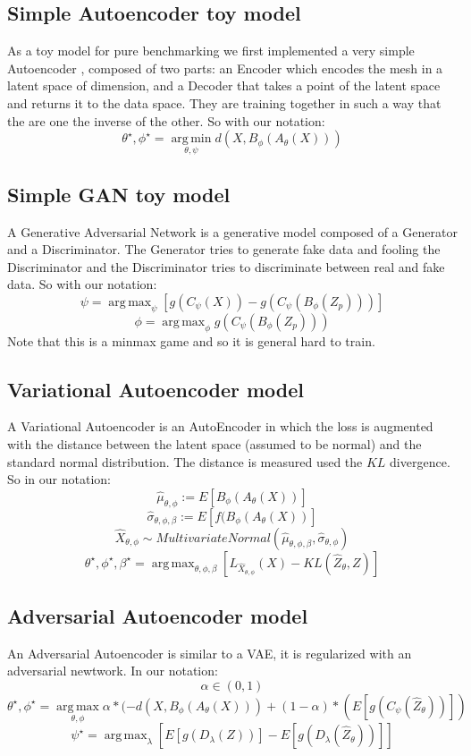 \documentclass{article}
\DeclareMathOperator*{\argmax}{arg\,max}
\DeclareMathOperator*{\argmin}{arg\,min}
\begin{document}
\subsection{Simple Autoencoder toy model}
As a toy model for pure benchmarking we first implemented a very simple Autoencoder \cite{auto}, composed of two parts: an Encoder which encodes the mesh in a latent space of dimension, and a Decoder that takes a point of the latent space and returns it to the data space. They are training together in such a way that the are one the inverse of the other. So with our notation:
$$\theta^{\star},\phi^{\star}=\argmin \limits_{\theta,\psi}d(X,B_{\phi}(A_{\theta}(X)))$$

\subsection{Simple GAN toy model}
A Generative Adversarial Network \cite{gan} is a generative model composed of a Generator and a Discriminator. The Generator tries to generate fake data and fooling the Discriminator and the Discriminator tries to discriminate between real and fake data. So with our notation:
$$\psi=\argmax_{\psi}[g(C_{\psi}(X))-g(C_{\psi}(B_{\phi}(Z_{p})))]$$
$$\phi=\argmax_{\phi} g(C_{\psi}(B_{\phi}(Z_{p})))$$
Note that this is a minmax game and so it is general hard to train.

\subsection{Variational Autoencoder model}
A Variational Autoencoder \cite{varauto} is an AutoEncoder in which the loss is augmented with the distance between the latent space (assumed to be normal) and the standard normal distribution. The distance is measured used the $KL$ divergence.\\
So in our notation:\\
$$\hat{\mu}_{\theta,\phi}:= E[B_{\phi}(A_{\theta}(X))]$$
$$\hat{\sigma}_{\theta,\phi,\beta}:=E[f(B_{\phi}(A_{\theta}(X))]$$
$$\hat{X}_{\theta,\phi}\sim MultivariateNormal(\hat{\mu}_{\theta,\phi,\beta},\hat{\sigma}_{\theta,\phi})$$
$$\theta^{\star},\phi^{\star},\beta^{\star}=\argmax_{\theta,\phi,\beta}[L_{\hat{X}_{\theta,\phi}}(X)-KL(\hat{Z}_{\theta},Z)]$$



\subsection{Adversarial Autoencoder model}
An Adversarial Autoencoder \cite{aae} is similar to a VAE, it is regularized with an adversarial newtwork. In our notation:
$$\alpha\in (0,1)$$
$$\theta^{\star},\phi^{\star}=\argmax\limits_{\theta,\phi}\alpha*(-d(X,B_{\phi}(A_{\theta}(X)))+(1-\alpha)*(E[g(C_{\psi}(\hat{Z}_{\theta}))])$$
$$\psi^{\star}=\argmax_{\lambda}  [E[g(D_{\lambda}(Z))]-E[g(D_{\lambda}(\hat{Z}_{\theta}))]]
$$
\end{document}
